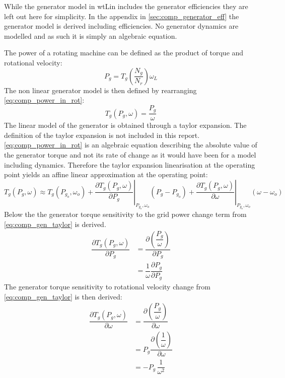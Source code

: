 While the generator model in wtLin includes the generator efficiencies they are left out here for simplicity. In the appendix in \cref{sec:comp_generator_eff} the generator model is derived including efficiencies. No generator dynamics are modelled and as such it is simply an algebraic equation.

The power of a rotating machine can be defined as the product of torque and rotational velocity:
\begin{equation}\label{eq:comp_power_in_rot}
	P_{g} = T_g \left( \dfrac{N_g}{N_r} \right)\omega_L
\end{equation}
The non linear generator model is then defined by rearranging \cref{eq:comp_power_in_rot}:
\begin{equation}\label{eq:comp_gen_torque}
	T_g(P_g, \omega) = \dfrac{P_g}{\omega}
\end{equation}
The linear model of the generator is obtained through a taylor expansion. The definition of the taylor expansion is not included in this report. \cref{eq:comp_power_in_rot} is an algebraic equation describing the absolute value of the generator torque and not its rate of change as it would have been for a model including dynamics. Therefore the taylor expansion linearisation at the operating point yields an affine linear approximation at the operating point:
\begin{equation}\label{eq:comp_gen_taylor}
	T_g( P_g, \omega) \approx T_g(P_{g_o}, \omega_o) + 
	\left. \dfrac{\partial T_g( P_g, \omega)}{\partial P_g} \right |_{P_{g_o},\omega_o} ( P_g-P_{g_o}) + 
	\left. \dfrac{\partial T_g( P_g, \omega)}{\partial \omega} \right |_{P_{g_o},\omega_o} (\omega - \omega_o)
\end{equation}
Below the the generator torque sensitivity to the grid power change term from \cref{eq:comp_gen_taylor} is derived.
\begin{align} 
	\dfrac{\partial T_g( P_g, \omega)}{\partial P_g} &= \dfrac{\partial \left (\dfrac{P_g}{\omega}\right )}{\partial P_g} \label{eq:comp_gen_1_1} \\
	& = \dfrac{1}{\omega} \dfrac{\partial P_g}{\partial P_g} \label{eq:comp_gen_1_2}
\end{align}
The generator torque sensitivity to rotational velocity change from \cref{eq:comp_gen_taylor} is then derived:
\begin{align}
	\dfrac{\partial T_g(P_g, \omega)}{\partial \omega} & = \dfrac{\partial \left (\dfrac{P_g}{\omega}\right )}{\partial \omega} \\
	& = P_g \dfrac{\partial \left (\dfrac{1}{\omega}\right )}{\partial \omega} \\
	& = -P_g \, \dfrac{1}{\omega^2}
\end{align}
